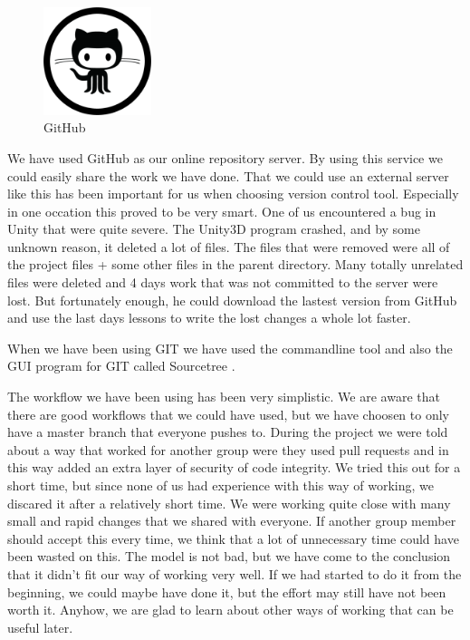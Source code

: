 \begin{figure}
	\capstart
	\centering
	\vspace{-10pt}
	\includegraphics[width=0.28\textwidth]{images/github}
	\vspace{-5pt}
	\caption[{G}it{H}ub logo]{{G}it{H}ub}
	\label{fig:github}
	\vspace{-10pt}
\end{figure}

We have used GitHub \cite{GitHub} as our online repository server. By using
this service we could easily share the work we have done. That we could use
an external server like this has been important for us when choosing version
control tool. Especially in one occation this proved to be very smart. One of
us encountered a bug in Unity that were quite severe. The Unity3D program
crashed, and by some unknown reason, it deleted a lot of files. The files that
were removed were all of the project files + some other files in the parent
directory. Many totally unrelated files were deleted and 4 days work that was
not committed to the server were lost. But fortunately enough, he could
download the lastest version from GitHub and use the last days lessons to write
the lost changes a whole lot faster.

When we have been using GIT we have used the commandline tool and also the GUI
program for GIT called Sourcetree \cite{SourceTree}.

The workflow we have been using has been very simplistic. We are aware that
there are good workflows that we could have used, but we have choosen to only
have a master branch that everyone pushes to. During the project we were told
about a way that worked for another group were they used pull requests and in
this way added an extra layer of security of code integrity. We tried this out
for a short time, but since none of us had experience with this way of working,
we discared it after a relatively short time. We were working quite close with
many small and rapid changes that we shared with everyone. If another group
member should accept this every time, we think that a lot of unnecessary time
could have been wasted on this. The model is not bad, but we have come to the
conclusion that it didn't fit our way of working very well. If we had started 
to do it from the beginning, we could maybe have done it, but the effort may
still have not been worth it. Anyhow, we are glad to learn about other ways of
working that can be useful later.